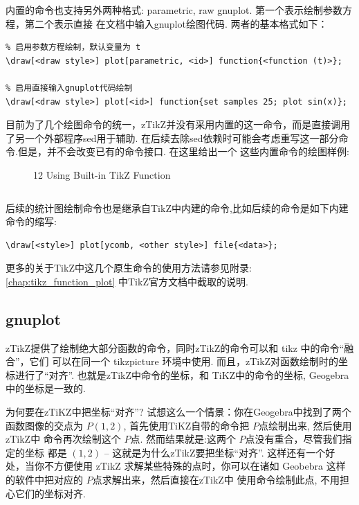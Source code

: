 \documentclass[
  hyper,    
  lang=cn,
  class=book,
  bib_index={load},
  mathSpec={envStyle=leftbar, alias},
  toc={column=2, title=目录},
]{zlatex}
\let\cmd\ztexverb
\begin{document}
内置的命令也支持另外两种格式: {parametric, raw gnuplot}. 第一个表示绘制参数方程，第二个表示直接
在文档中输入gnuplot绘图代码. 两者的基本格式如下：
\begin{verbatim}
% 启用参数方程绘制，默认变量为 t
\draw[<draw style>] plot[parametric, <id>] function{<function (t)>};

% 启用直接输入gnuplot代码绘制
\draw[<draw style>] plot[<id>] function{set samples 25; plot sin(x)};
\end{verbatim}

目前为了几个绘图命令的统一，zTikZ并没有采用内置的这一命令，而是直接调用了另一个外部程序sed用于辅助.
在后续去除sed依赖时可能会考虑重写这一部分命令.但是，并不会改变已有的命令接口. 在这里给出一个
这些内置命令的绘图样例:

\begin{figure}[!htb]
    \centering
    
    \caption{12 Using Built-in TikZ Function}
    \label{fig:12-inverse-function-2}
\end{figure}

\inputminted{latex}{./example_12.tex}

后续的统计图绘制命令也是继承自TikZ中内建的命令,比如后续的\cmd{\BarPlot}命令是如下内建命令的缩写:
\begin{verbatim}
\draw[<style>] plot[ycomb, <other style>] file{<data>};
\end{verbatim}

更多的关于TikZ中这几个原生命令的使用方法请参见附录:\cref{chap:tikz_function_plot} 中TikZ官方文档中截取的说明.

\subsection{gnuplot}
zTikZ提供了绘制绝大部分函数的命令，同时zTikZ的命令可以和 {tikz} 中的命令``融合''，它们
可以在同一个 {tikzpicture} 环境中使用. 而且，zTikZ对函数绘制时的坐标进行了``对齐''. 
也就是zTikZ中命令的坐标，和 {TiKZ}中的命令的坐标, Geogebra中的坐标是一致的. 

为何要在zTiKZ中把坐标``对齐''? 试想这么一个情景：你在Geogebra中找到了两个函数图像的交点为 $P(1, 2)$,
首先使用TiKZ自带的\cmd{\filldraw}命令把 $P$点绘制出来, 然后使用zTikZ中
\cmd{\ShowPoint}命令再次绘制这个 $P$点. 然而结果就是:这两个 $P$点没有重合，尽管我们指定的坐标
都是 $(1, 2)$ -- 这就是为什么zTikZ要把坐标``对齐''. 这样还有一个好处，当你不方便使用 zTikZ 
求解某些特殊的点时，你可以在诸如 Geobebra 这样的软件中把对应的 $P$点求解出来，然后直接在zTikZ中
使用\cmd{\ShowPoint}命令绘制此点, 不用担心它们的坐标对齐.
\end{document}
